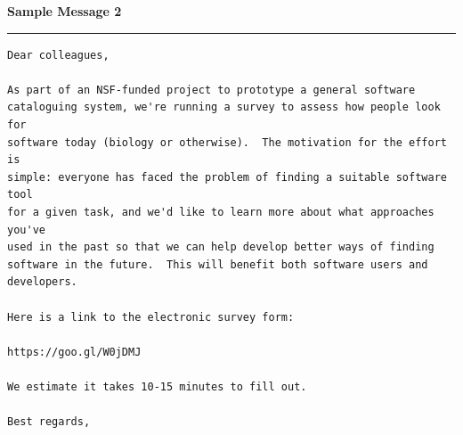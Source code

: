 \documentclass{casicswhitepaper}
\begin{document}
\vspace*{2em}
\textbf{Sample Message 2}
\hrule

\small
\begin{verbatim}
Dear colleagues,

As part of an NSF-funded project to prototype a general software
cataloguing system, we're running a survey to assess how people look for
software today (biology or otherwise).  The motivation for the effort is
simple: everyone has faced the problem of finding a suitable software tool
for a given task, and we'd like to learn more about what approaches you've
used in the past so that we can help develop better ways of finding
software in the future.  This will benefit both software users and
developers.

Here is a link to the electronic survey form:

https://goo.gl/W0jDMJ

We estimate it takes 10-15 minutes to fill out.

Best regards,
\end{verbatim}
\normalsize

\clearpage


\end{document}
